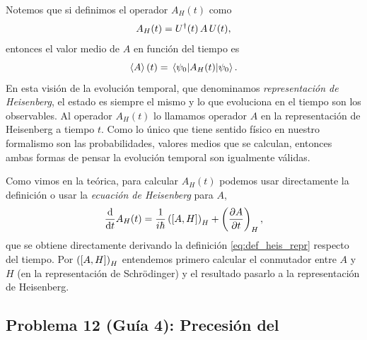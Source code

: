 \documentclass[10pt, a4paper]{article}
\numberwithin{equation}{subsection}
\begin{document}
Notemos que si definimos el operador $A_H(t)$ como
\begin{equation} \label{eq:def_heis_repr}
  A_H(t) = U^\dagger(t)\,{A}\,U(t),
\end{equation}
entonces el valor medio de $A$ en función del tiempo es
\begin{equation}
  \expval{A}(t) = \expval{A_H(t)}{\psi_0}.
\end{equation}
En esta visión de la evolución temporal, que denominamos \emph{representación
de Heisenberg}, el estado es siempre el mismo y lo que evoluciona en el tiempo
son los observables. Al operador $A_H(t)$ lo llamamos operador $A$ en la
representación de Heisenberg a tiempo $t$.
Como lo único que tiene sentido físico en nuestro formalismo son las
probabilidades, valores medios que se calculan, entonces ambas formas de
pensar la evolución temporal son igualmente válidas.

Como vimos en la teórica, para calcular $A_H(t)$ podemos usar directamente la
definición o usar la \emph{ecuación de Heisenberg} para $A$,
\begin{equation} \label{eq:def_heis_eq}
  \dv{t}A_H(t) = \frac{1}{i\hbar}\left(\comm{A}{H}\right)_H +
    \left(\pdv{A}{t}\right)_H,
\end{equation}
que se obtiene directamente derivando la definición \eqref{eq:def_heis_repr}
respecto del tiempo. Por $\left(\comm{A}{H}\right)_H$ entendemos primero
calcular el conmutador entre $A$ y $H$ (en la representación de Schrödinger) y
el resultado pasarlo a la representación de Heisenberg.

\subsection{Problema 12 (Guía 4): Precesión del \spin}
\end{document}
